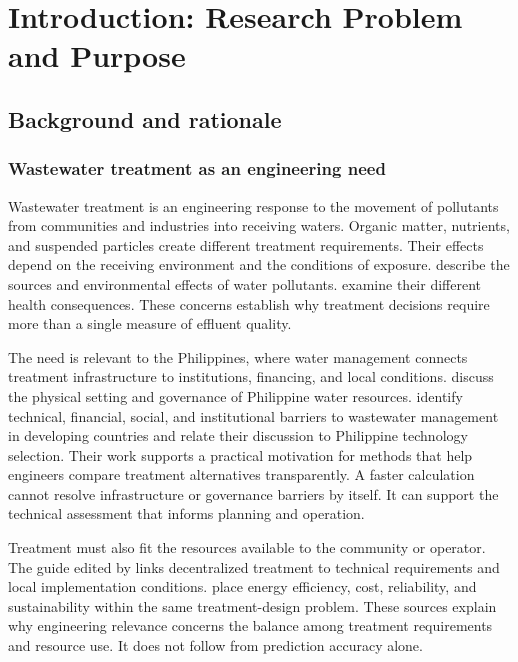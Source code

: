 \chapter{Introduction: Research Problem and Purpose}
\label{ch:introduction}

\section{Background and rationale}

\subsection{Wastewater treatment as an engineering need}

Wastewater treatment is an engineering response to the movement of pollutants from communities and industries into receiving waters. Organic matter, nutrients, and suspended particles create different treatment requirements. Their effects depend on the receiving environment and the conditions of exposure. \citet{Madhav2019} describe the sources and environmental effects of water pollutants. \citet{Lin2022} examine their different health consequences. These concerns establish why treatment decisions require more than a single measure of effluent quality.

The need is relevant to the Philippines, where water management connects treatment infrastructure to institutions, financing, and local conditions. \citet{Tabios2020} discuss the physical setting and governance of Philippine water resources. \citet{DamalerioBarriers2022} identify technical, financial, social, and institutional barriers to wastewater management in developing countries and relate their discussion to Philippine technology selection. Their work supports a practical motivation for methods that help engineers compare treatment alternatives transparently. A faster calculation cannot resolve infrastructure or governance barriers by itself. It can support the technical assessment that informs planning and operation.

Treatment must also fit the resources available to the community or operator. The guide edited by \citet{Ulrich2009} links decentralized treatment to technical requirements and local implementation conditions. \citet{Jafarinejad2020} place energy efficiency, cost, reliability, and sustainability within the same treatment-design problem. These sources explain why engineering relevance concerns the balance among treatment requirements and resource use. It does not follow from prediction accuracy alone.


